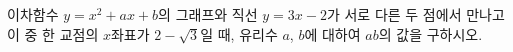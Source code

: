 이차함수 $y=x^2+ax+b$의 그래프와 직선 $y=3x-2$가 서로 다른 두 점에서 만나고 이 중 한 교점의 $x$좌표가 $2-\sqrt{3}$일 때, 유리수 $a$, $b$에 대하여 $ab$의 값을 구하시오.
